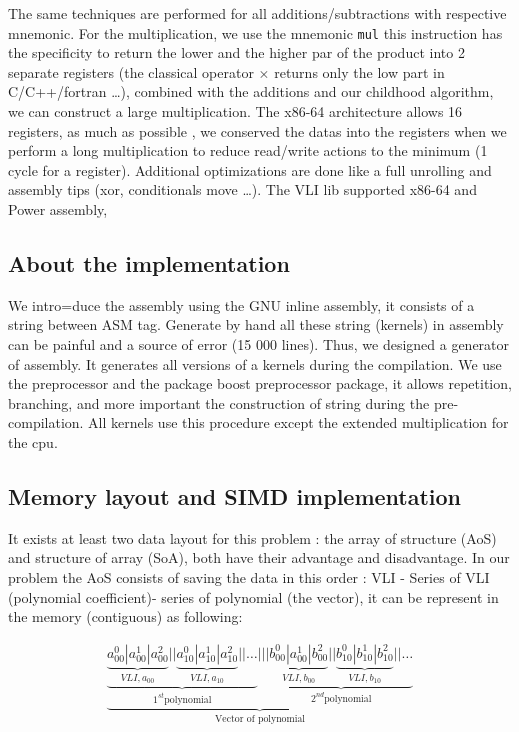 \documentclass[11pt]{amsart}
\begin{document}
The same techniques are performed for all additions/subtractions with respective mnemonic. For the multiplication, we use the mnemonic \texttt{mul} this instruction has the specificity to return the lower and the higher
par of the product into 2 separate registers (the classical operator $\times$ returns only the low part in C/C++/fortran \dots), combined with the additions and our childhood algorithm, we can construct a large multiplication.  
The x86-64 architecture allows 16 registers, as much as possible , we conserved the datas into the registers when we perform a long multiplication to reduce read/write actions to the minimum (1 cycle for a register).
Additional optimizations are done like a full unrolling and assembly tips (xor, conditionals move \dots).  The VLI lib supported  x86-64 and Power assembly,

\subsection*{About the implementation}

We intro=duce the assembly using the GNU inline assembly, it consists of a string between ASM tag.
Generate by hand all these  string (kernels) in assembly can be painful and a source of error (15 000 lines). 
Thus, we designed a generator of assembly. It generates all versions of a kernels during the compilation.   
We use the preprocessor and the package boost preprocessor package, it allows repetition, branching, and more
 important the construction of string during the pre-compilation.  All kernels use this procedure except the extended multiplication for the cpu.

\subsection*{Memory layout and SIMD implementation}

It exists at least two data layout for this problem : the array of structure (AoS) and structure of array (SoA), both have their advantage and disadvantage. In our problem the AoS consists of saving the data in this order  : VLI - Series of VLI (polynomial coefficient)- series of polynomial (the vector), it can be represent in the memory (contiguous) as following:

\begin{eqnarray}
 \underbrace{
 \underbrace{ \underbrace{a^0_{00} | a^1_{00} | a^2_{00}}_{VLI, a_{00} } || \underbrace{a^0_{10} | a^1_{10} | a^2_{10}}_{VLI, a_{10}} ||   \dots  }_{1^{st} \textrm{polynomial}} 
      |||    \underbrace{ \underbrace{b^0_{00} | a^1_{00} | b^2_{00}}_{VLI, b_{00} } || \underbrace{b^0_{10} | b^1_{10} | b^2_{10}}_{VLI, b_{10}} ||   \dots  }_{2^{nd} \textrm{polynomial} } }_{\textrm{Vector of polynomial}} \nonumber
\end{eqnarray}
\end{document}
